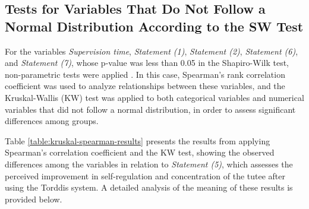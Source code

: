                 \subsection{Tests for Variables That Do Not Follow a Normal Distribution According to the SW Test}
                For the variables \textit{Supervision time}, \textit{Statement (1)}, \textit{Statement (2)}, \textit{Statement (6)}, and \textit{Statement (7)}, whose p-value was less than 0.05 in the Shapiro-Wilk test, non-parametric tests were applied \citep{Smeeton2025Applied}. In this case, Spearman’s rank correlation coefficient \citep{Yu2024Robust} was used to analyze relationships between these variables, and the Kruskal-Wallis (KW) test \citep{Jamil2024Influence} was applied to both categorical variables and numerical variables that did not follow a normal distribution, in order to assess significant differences among groups.
                
                Table \ref{table:kruskal-spearman-results} presents the results from applying Spearman’s correlation coefficient and the KW test, showing the observed differences among the variables in relation to \textit{Statement (5)}, which assesses the perceived improvement in self-regulation and concentration of the tutee after using the Torddis system. A detailed analysis of the meaning of these results is provided below.
                
